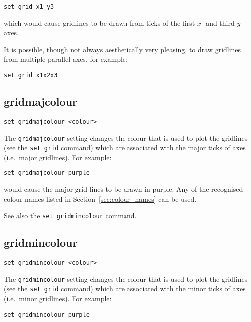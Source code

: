 \begin{verbatim}
set grid x1 y3
\end{verbatim}

\noindent which would cause gridlines to be drawn from ticks of the first $x$- and third
$y$-axes.

It is possible, though not always aesthetically very pleasing, to draw
gridlines from multiple parallel axes, for example:

\begin{verbatim}
set grid x1x2x3
\end{verbatim}


\subsection{gridmajcolour}

\begin{verbatim}
set gridmajcolour <colour>
\end{verbatim}

The {\tt gridmajcolour} setting changes the colour that is used to plot the
gridlines (see the {\tt set grid} command) which are associated with the major
ticks of axes (i.e.\ major gridlines). For example:

\begin{verbatim}
set gridmajcolour purple
\end{verbatim}

\noindent would cause the major grid lines to be drawn in purple. Any of the recognised
colour names listed in Section~\ref{sec:colour_names} can be used.

See also the {\tt set gridmincolour} command.


\subsection{gridmincolour}

\begin{verbatim}
set gridmincolour <colour>
\end{verbatim}

The {\tt gridmincolour} setting changes the colour that is used to plot the
gridlines (see the {\tt set grid} command) which are associated with the minor
ticks of axes (i.e.\ minor gridlines). For example:

\begin{verbatim}
set gridmincolour purple
\end{verbatim}

